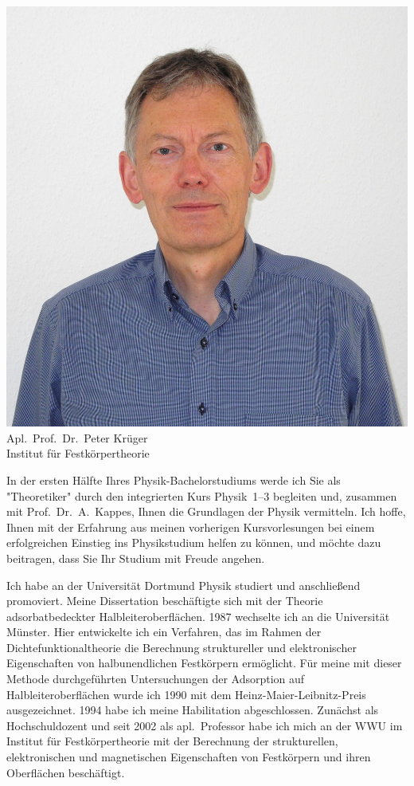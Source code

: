 \begin{multicols}{2}
\begin{center}
	\includegraphics[width=\columnwidth, height=0.35\textheight]{res/vorstellungsfotos/peter_krueger_cropped.jpg}\\
	Apl.\ Prof.\ Dr.\ Peter Krüger\\
	Institut für Festkörpertheorie
\end{center}

In der ersten Hälfte Ihres Physik-Bachelorstudiums werde ich Sie als "Theoretiker" durch den integrierten Kurs Physik~1--3 begleiten und, zusammen mit Prof.\ Dr.\ A.\ Kappes, Ihnen die Grundlagen der Physik vermitteln.
Ich hoffe, Ihnen mit der Erfahrung aus meinen vorherigen Kursvorlesungen bei einem erfolgreichen Einstieg ins Physikstudium helfen zu können, und möchte dazu beitragen, dass Sie Ihr Studium mit Freude angehen.

Ich habe an der Universität Dortmund Physik studiert und anschließend
promoviert.
Meine Dissertation beschäftigte sich mit der Theorie adsorbatbedeckter Halbleiteroberflächen.
1987 wechselte ich an die Universität Münster.
Hier entwickelte ich ein Verfahren, das im Rahmen der Dichtefunktionaltheorie die Berechnung struktureller und elektronischer Eigenschaften von halbunendlichen Festkörpern ermöglicht.
Für meine mit dieser Methode durchgeführten Untersuchungen der Adsorption auf Halbleiteroberflächen wurde ich 1990 mit dem Heinz-Maier-Leibnitz-Preis ausgezeichnet.
1994 habe ich meine Habilitation abgeschlossen.
Zunächst als Hochschuldozent und seit 2002 als apl.\ Professor habe ich mich an der WWU im Institut für Festkörpertheorie mit der Berechnung der strukturellen, elektronischen und magnetischen Eigenschaften von Festkörpern und ihren Oberflächen beschäftigt.


\end{multicols}
